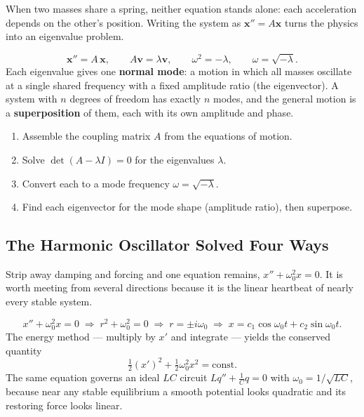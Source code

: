When two masses share a spring, neither equation stands alone: each acceleration
depends on the other's position. Writing the system as $\mathbf{x}'' = A\mathbf{x}$
turns the physics into an eigenvalue problem.

\begin{formulabox}
\[ \mathbf{x}'' = A\,\mathbf{x}, \qquad A\mathbf{v} = \lambda\mathbf{v}, \qquad
   \omega^{2} = -\lambda, \qquad \omega = \sqrt{-\lambda}. \]
Each eigenvalue gives one \textbf{normal mode}: a motion in which all masses
oscillate at a single shared frequency with a fixed amplitude ratio (the
eigenvector). A system with $n$ degrees of freedom has exactly $n$ modes, and the
general motion is a \textbf{superposition} of them, each with its own amplitude and
phase.
\end{formulabox}

\begin{methodbox}
\begin{enumerate}[leftmargin=1.6em, itemsep=2pt]
    \item Assemble the coupling matrix $A$ from the equations of motion.
    \item Solve $\det(A-\lambda I)=0$ for the eigenvalues $\lambda$.
    \item Convert each to a mode frequency $\omega = \sqrt{-\lambda}$.
    \item Find each eigenvector for the mode shape (amplitude ratio), then superpose.
\end{enumerate}
\end{methodbox}

\subsection{The Harmonic Oscillator Solved Four Ways}

Strip away damping and forcing and one equation remains, $x''+\omega_0^{2}x=0$. It is
worth meeting from several directions because it is the linear heartbeat of nearly
every stable system.

\begin{formulabox}
\[ x'' + \omega_0^{2}x = 0 \;\Longrightarrow\; r^{2}+\omega_0^{2}=0 \;\Longrightarrow\;
   r = \pm i\omega_0 \;\Longrightarrow\; x = c_1\cos\omega_0 t + c_2\sin\omega_0 t. \]
The energy method --- multiply by $x'$ and integrate --- yields the conserved
quantity
\[ \tfrac{1}{2}(x')^{2} + \tfrac{1}{2}\omega_0^{2}x^{2} = \text{const}. \]
The same equation governs an ideal $LC$ circuit $L q'' + \tfrac{1}{C}q = 0$ with
$\omega_0 = 1/\sqrt{LC}$, because near any stable equilibrium a smooth potential
looks quadratic and its restoring force looks linear.
\end{formulabox}

